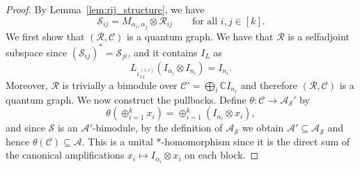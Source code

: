 \documentclass[10pt,a4paper]{amsart}
\newcommand{\A}{{\mathcal{A}}}
\newcommand{\C}{{\mathcal{C}}}
\newcommand{\R}{{\mathcal{R}}}
\newcommand{\eps}{\varepsilon}
\renewcommand{\S}{{\mathcal{S}}}
\begin{document}
\begin{proof}
By Lemma~\ref{lem:rij_structure}, we have
\[
\S_{ij}=M_{\alpha_i,\alpha_j}\otimes \R_{ij}
\qquad \text{for all } i,j\in [k].
\]
We first show that $(\R,\C)$ is a quantum graph. 
We have that $\R$ is a selfadjoint subspace since $(\S_{ij})^*=\S_{ji}$, and it
contains $I_L$ as 
\[
L_{\eps_{11}^{(i,i)}}(I_{\alpha_i}\otimes I_{n_i})=I_{n_i}.
\]
Moreover, $\R$ is trivially a bimodule over $\C'=\bigoplus_i\mathbb C I_{n_i}$ and therefore
$(\R,\C)$ is a quantum graph. We now construct the pullbacks. Define $\theta \colon \C \to \A_{\S}'$ by
\[
\theta (\oplus_{i=1}^k x_i)
=
\oplus_{i=1}^k (I_{\alpha_i}\otimes x_i),
\]
and since $\S$ is an $\A'$-bimodule, by the definition of $\A_\S$ we obtain $ \A'\subseteq \A_{\S}$ and hence $\theta(\C)\subseteq \A$.
This is a unital $*$-homomorphism since it is the direct sum of the canonical
amplifications $x_i\mapsto I_{\alpha_i}\otimes x_i$ on each block. 


\end{proof}
\end{document}
